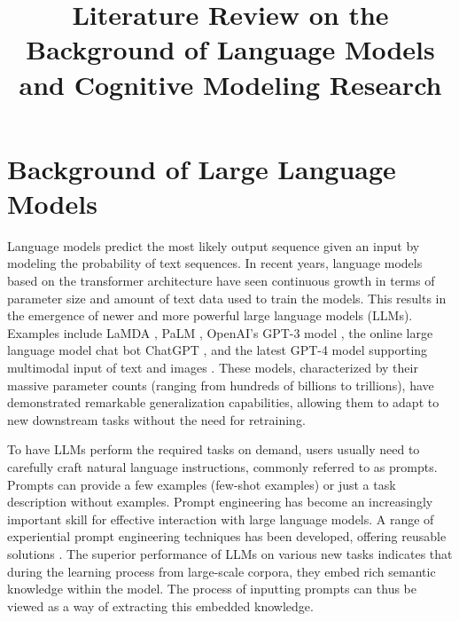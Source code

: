 
\begin{survey}
\label{cha:survey}

\title{Literature Review on the Background of Language Models and Cognitive Modeling Research}
\maketitle


\tableofcontents





\section{Background of Large Language Models}

Language models predict the most likely output sequence given an input by modeling the probability of text sequences. In recent years, language models based on the transformer architecture \cite{vaswani2017attention} have seen continuous growth in terms of parameter size and amount of text data used to train the models. This results in the emergence of newer and more powerful large language models (LLMs). Examples include LaMDA \cite{thoppilan2022lamda}, PaLM \cite{anil2023palm}, OpenAI's GPT-3 model \cite{brown2020language}, the online large language model chat bot ChatGPT \cite{abdullah2022chatgpt}, and the latest GPT-4 model supporting multimodal input of text and images \cite{achiam2023gpt}. These models, characterized by their massive parameter counts (ranging from hundreds of billions to trillions), have demonstrated remarkable generalization capabilities, allowing them to adapt to new downstream tasks without the need for retraining.

To have LLMs perform the required tasks on demand, users usually need to carefully craft natural language instructions, commonly referred to as prompts. Prompts can provide a few examples (few-shot examples) or just a task description without examples. Prompt engineering has become an increasingly important skill for effective interaction with large language models. A range of experiential prompt engineering techniques has been developed, offering reusable solutions \cite{white2023prompt}. The superior performance of LLMs on various new tasks indicates that during the learning process from large-scale corpora, they embed rich semantic knowledge within the model. The process of inputting prompts can thus be viewed as a way of extracting this embedded knowledge.


\end{survey}
